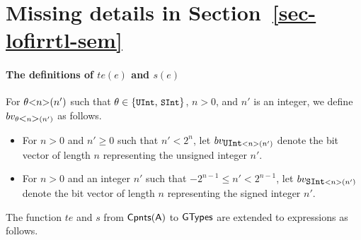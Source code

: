 

%

\section{Missing details in Section~\ref{sec-lofirrtl-sem}}\label{app-lofirrtl}

\paragraph*{The definitions of $te(e)$ and $s(e)$}
%
For $\theta \mbox{<} n \mbox{>}(n')$ such that $\theta \in \{\mbox{\prettyll{UInt}, \prettyll{SInt}}\}$, $n > 0$, and $n'$ is an integer, we define $bv_{\theta \mbox{<} n \mbox{>}(n')}$ as follows.
\begin{itemize}
\item For $n > 0$ and $n' \ge 0$ such that $n' < 2^n$, let $bv_{\mbox{\prettyll{UInt}}<n>(n')}$ denote the bit vector of length $n$ representing the unsigned integer $n'$.
%
\item For $n > 0$ and an integer $n'$ such that $-2^{n-1} \le n' < 2^{n-1}$, let $bv_{\mbox{\prettyll{SInt}}<n>(n')}$ denote the bit vector of length $n$ representing the signed integer $n'$.
\end{itemize}
The function $te$ and $s$ from $\sf Cpnts(A)$ to $\sf GTypes$ are extended to expressions as follows.
